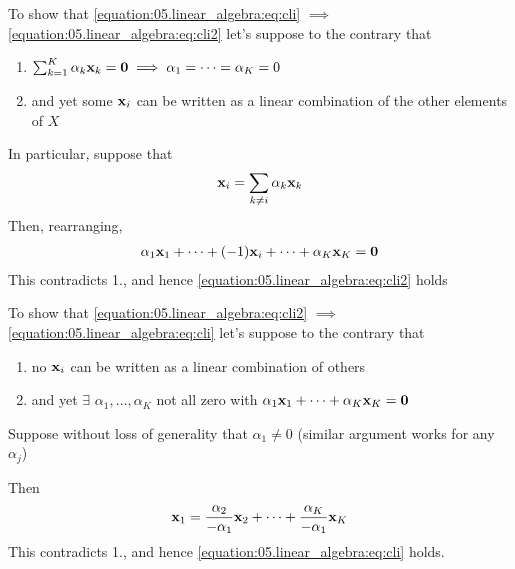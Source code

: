 \documentclass[letterpaper,10pt,english]{jupyterBook}
\begin{document}
\sphinxAtStartPar
To show that \eqref{equation:05.linear_algebra:eq:cli} \(\implies\) \eqref{equation:05.linear_algebra:eq:cli2} let’s suppose to the contrary that
\begin{enumerate}
%
\item {} 
\sphinxAtStartPar
\(\sum_{k=1}^K \alpha_k {\bf x}_k = {\bf 0} \implies \alpha_1 = \cdots = \alpha_K = 0\)

\item {} 
\sphinxAtStartPar
and yet some \({\bf x}_i\) can be written as a linear combination of the other elements of \(X\)

\end{enumerate}

\sphinxAtStartPar
In particular, suppose that
\begin{equation*}
\begin{split}
%
{\bf x}_i = \sum_{k \ne i} \alpha_k {\bf x}_k 
%
\end{split}
\end{equation*}
\sphinxAtStartPar
Then, rearranging,
\begin{equation*}
\begin{split}
%
\alpha_1 {\bf x}_1 + \cdots + (-1) {\bf x}_i 
+ \cdots + \alpha_K {\bf x}_K = {\bf 0}
%
\end{split}
\end{equation*}
\sphinxAtStartPar
This contradicts 1., and hence \eqref{equation:05.linear_algebra:eq:cli2} holds

\sphinxAtStartPar
To show that \eqref{equation:05.linear_algebra:eq:cli2} \(\implies\) \eqref{equation:05.linear_algebra:eq:cli} let’s suppose to
the contrary that
\begin{enumerate}
%
\item {} 
\sphinxAtStartPar
no \({\bf x}_i\) can be written as a linear combination of others

\item {} 
\sphinxAtStartPar
and yet \(\exists\) \(\alpha_1, \ldots, \alpha_K\) not all zero with \(\alpha_1 {\bf x}_1 + \cdots + \alpha_K {\bf x}_K = {\bf 0}\)

\end{enumerate}

\sphinxAtStartPar
Suppose without loss of generality that \(\alpha_1 \ne 0\)
(similar argument works for any \(\alpha_j\))

\sphinxAtStartPar
Then
\begin{equation*}
\begin{split}
%
{\bf x}_1 = \frac{\alpha_2}{-\alpha_1} {\bf x}_2 
+ \cdots + \frac{\alpha_K}{-\alpha_1} {\bf x}_K 
%
\end{split}
\end{equation*}
\sphinxAtStartPar
This contradicts 1., and hence \eqref{equation:05.linear_algebra:eq:cli} holds.
\end{document}
